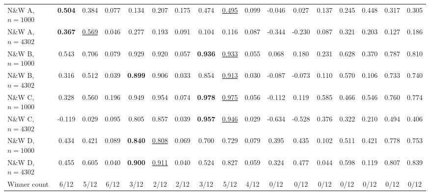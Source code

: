 \begin{table}[!t]
{{{\begin{tabular}{l@{\hspace{\tablegroupsep}}ccc@{\hspace{\tablegroupsep}}ccc@{\hspace{\tablegroupsep}}ccc@{\hspace{\tablegroupsep}}ccc@{\hspace{\tablegroupsep}}cc@{\hspace{\tablegroupsep}}cc}
N\&W A, $n=1000$ & \textbf{0.504} & 0.384 & \cellcolor{gray!20}0.077 & 0.134 & 0.207 & 0.175 & 0.474 & \underline{0.495} & 0.099 & -0.046 & 0.027 & 0.137 & 0.245 & 0.448 & 0.317 & 0.305 \\
N\&W A, $n=4302$ & \textbf{0.367} & \underline{0.569} & \cellcolor{gray!20}0.046 & 0.277 & 0.193 & 0.091 & 0.104 & 0.116 & 0.087 & -0.344 & -0.230 & 0.087 & 0.321 & 0.203 & 0.127 & 0.186 \\
N\&W B, $n=1000$ & 0.543 & 0.706 & 0.079 & 0.929 & 0.920 & 0.057 & \textbf{0.936} & \underline{0.933} & \cellcolor{gray!20}0.055 & 0.068 & 0.180 & 0.231 & 0.628 & 0.370 & 0.787 & 0.810 \\
N\&W B, $n=4302$ & 0.316 & 0.512 & 0.039 & \textbf{0.899} & 0.906 & 0.033 & 0.854 & \underline{0.913} & \cellcolor{gray!20}0.030 & -0.087 & -0.073 & 0.110 & 0.570 & 0.106 & 0.733 & 0.740 \\
N\&W C, $n=1000$ & 0.328 & 0.560 & 0.196 & 0.949 & 0.954 & 0.074 & \textbf{0.978} & \underline{0.975} & \cellcolor{gray!20}0.056 & -0.112 & 0.119 & 0.585 & 0.466 & 0.546 & 0.760 & 0.774 \\
N\&W C, $n=4302$ & -0.119 & 0.029 & 0.095 & 0.805 & 0.857 & 0.039 & \textbf{0.957} & \underline{0.946} & \cellcolor{gray!20}0.029 & -0.634 & -0.528 & 0.376 & 0.322 & 0.210 & 0.494 & 0.406 \\
N\&W D, $n=1000$ & 0.434 & 0.421 & 0.089 & \textbf{0.840} & \underline{0.808} & \cellcolor{gray!20}0.069 & 0.700 & 0.729 & 0.079 & 0.395 & 0.435 & 0.102 & 0.511 & 0.421 & 0.778 & 0.753 \\
N\&W D, $n=4302$ & 0.455 & 0.605 & 0.040 & \textbf{0.900} & \underline{0.911} & \cellcolor{gray!20}0.040 & 0.524 & 0.827 & 0.059 & 0.324 & 0.477 & 0.044 & 0.598 & 0.119 & 0.807 & 0.839 \\
\midrule
Winner count & 6/12 & 5/12 & 6/12 & 3/12 & 2/12 & 2/12 & 3/12 & 5/12 & 4/12 & 0/12 & 0/12 & 0/12 & 0/12 & 0/12 & 0/12 & 0/12 \\
\bottomrule
\end{tabular}%
}
}
}
\end{table}
